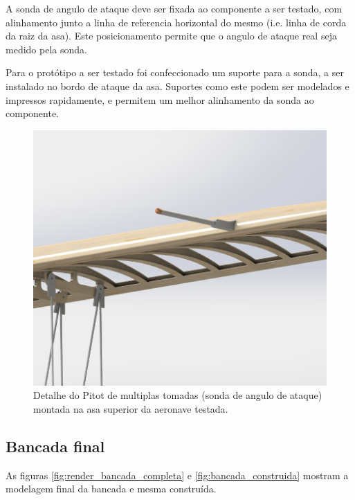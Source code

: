 A sonda de angulo de ataque deve ser fixada ao componente a ser testado, com alinhamento junto a linha de referencia horizontal do mesmo (i.e. linha de corda da raiz da asa). Este posicionamento permite que o angulo de ataque real seja medido pela sonda. 

Para o protótipo a ser testado foi confeccionado um suporte para a sonda, a ser instalado no bordo de ataque da asa. Suportes como este podem ser modelados e impressos rapidamente, e permitem um melhor alinhamento da sonda ao componente.

\begin{figure}[!ht]
    \centering
    \includegraphics[width=.8\linewidth]{figuras/renders/sonda_aoa_asa_superior.png}
    \caption{Detalhe do Pitot de multiplas tomadas (sonda de angulo de ataque) montada na asa superior da aeronave testada\cite{autor}.}
    \label{fig:placeholder}
\end{figure}

\subsection{Bancada final}

As figuras \ref{fig:render_bancada_completa} e \ref{fig:bancada_construida} mostram a modelagem final da bancada e mesma construída.

